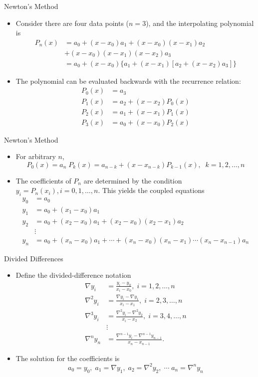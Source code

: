 \documentclass{beamer}
\begin{document}
\begin{frame}{Newton's Method}
\begin{itemize}
\item Consider there are four data points  ($n=3$), and the interpolating polynomial is 
\begin{align*}
P_n(x)&=a_0+(x-x_0)a_1+(x-x_0)(x-x_1)a_2 \\
&+ (x-x_0)(x-x_1)(x-x_2)a_3 \\
&= a_0 +(x-x_0) \{ a_1 +(x-x_1) [a_2+(x-x_2)a_3]\} 
\end{align*}
\item The polynomial can be evaluated backwards with the recurrence relation:
\begin{align*}
P_0(x)&=a_3\\
P_1(x)&=a_2+(x-x_2)P_0(x)\\
P_2(x)&=a_1+(x-x_1)P_1(x)\\
P_3(x)&=a_0+(x-x_0)P_2(x)
\end{align*}
\end{itemize}
\end{frame}
\begin{frame}{Newton's Method}
\begin{itemize}
\item For arbitrary $n$, 
\[
P_0(x)=a_n\; P_k(x)=a_{n-k}+ (x-x_{n-k})P_{k-1}(x), \;\; k=1,2,\ldots,n
\]
\item The coefficients of $P_n$ are determined by the condition $y_i=P_n(x_i), i=0, 1, \ldots,n$. This yields the coupled equations
\begin{align*}
y_0&=a_0\\
y_1&=a_0+(x_1-x_0)a_1\\
y_2&=a_0+(x_2-x_0)a_1+(x_2-x_0)(x_2-x_1)a_2\\
& \vdots\\
y_n&=a_0+(x_n-x_0)a_1+\cdots+(x_n-x_0)(x_n-x_1)\cdots(x_n-x_{n-1})a_n
\end{align*}
\end{itemize}
\end{frame}
\begin{frame}{Divided Differences}
\begin{itemize}
\item Define the divided-difference notation 
\begin{align*}
\nabla y_i&=\frac{y_i-y_0}{x_i-x_0}, \; i=1,2,\ldots, n\\
\nabla^2 y_i&=\frac{\nabla y_i-\nabla y_1}{x_i-x_1}, \; i=2,3,\ldots, n\\
\nabla^3 y_i&=\frac{\nabla^2 y_i-\nabla^2 y_2}{x_i-x_2}, \; i=3,4,\ldots, n\\
& \vdots\\
\nabla^n y_n&=\frac{\nabla^{n-1} y_i-\nabla^{n-1} y_{n-1}}{x_n-x_{n-1}}.
\end{align*}
\item The solution for the coefficients is 
\[
a_0=y_0,\; a_1=\nabla y_1, \; a_2=\nabla^2 y_2, \;\cdots\; a_n=\nabla^n y_n
\]
\end{itemize}
\end{frame}
\end{document}
